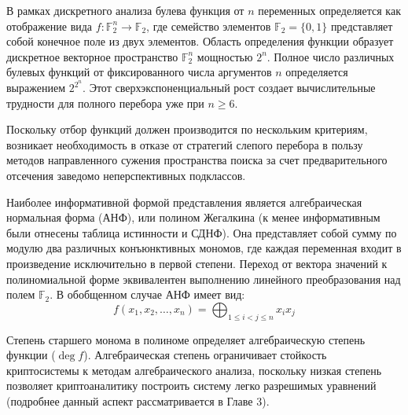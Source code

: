 \documentclass[14pt, a4paper]{extarticle}
\begin{document}
\vspace{2em}
\vspace{1em}


В рамках дискретного анализа булева функция от $n$ переменных
определяется как отображение вида $f: \mathbb{F}_2^n \to \mathbb{F}_2$,
где семейство элементов $\mathbb{F}_2 = \{0, 1\}$ представляет собой конечное поле из двух элементов.
Область определения функции образует дискретное векторное пространство $\mathbb{F}_2^n$ мощностью $2^n$.
Полное число различных булевых функций от фиксированного числа аргументов $n$ определяется выражением $2^{2^n}$.
Этот сверхэкспоненциальный рост создает вычислительные трудности для полного перебора уже при $n \ge 6$.

Поскольку отбор функций должен производится по нескольким критериям,
возникает необходимость в отказе от стратегий слепого перебора в пользу
методов направленного сужения пространства поиска за счет предварительного отсечения заведомо неперспективных подклассов.

\vspace{2em}
\vspace{1em}

Наиболее информативной формой представления является алгебраическая нормальная форма (АНФ),
или полином Жегалкина (к менее информативным были отнесены таблица истинности и СДНФ).
Она представляет собой сумму по модулю два различных конъюнктивных мономов,
где каждая переменная входит в произведение исключительно в первой степени.
Переход от вектора значений к полиномиальной форме эквивалентен выполнению линейного преобразования над полем $\mathbb{F}_2$.
В обобщенном случае АНФ имеет вид:
\begin{equation*}
f(x_1, x_2, \dots, x_n) = \bigoplus_{1 \le i < j \le n} x_i x_j
\end{equation*}

Степень старшего монома в полиноме определяет алгебраическую степень функции ($\deg f$).
Алгебраическая степень ограничивает стойкость криптосистемы к методам алгебраического анализа,
поскольку низкая степень позволяет криптоаналитику построить систему легко разрешимых уравнений (подробнее данный аспект рассматривается в Главе 3).
\end{document}
